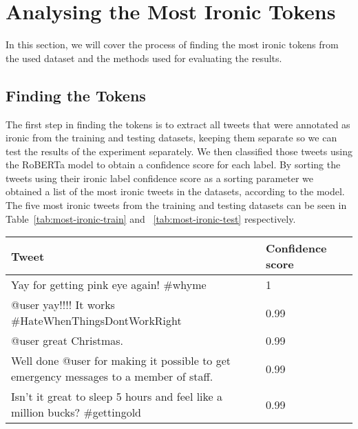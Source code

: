 \documentclass[10pt, a4paper]{article}
\begin{document}
\section{Analysing the Most Ironic Tokens}

In this section, we will cover the process of finding the most ironic tokens from the used dataset and the methods used for evaluating the results.

\subsection{Finding the Tokens}

The first step in finding the tokens is to extract all tweets that were annotated as ironic from the training and testing datasets, keeping them separate so we can test the results of the experiment separately.
We then classified those tweets using the RoBERTa model to obtain a confidence score for each label.
By sorting the tweets using their ironic label confidence score as a sorting parameter we obtained a list of the most ironic tweets in the datasets, according to the model.
The five most ironic tweets from the training and testing datasets can be seen in Table~\ref{tab:most-ironic-train} and ~\ref{tab:most-ironic-test} respectively.

\begin{table*}
\caption{Most Ironic Tweets in the Training Set}
\label{tab:most-ironic-train}
\begin{center}
\begin{tabular}{llr}
\toprule
Tweet & Confidence score\\
\midrule
Yay for getting pink eye again!  \#whyme                                                & 1 \\
@user yay!!!! It works  \#HateWhenThingsDontWorkRight                                   & 0.99 \\
@user great Christmas.                                                                  & 0.99 \\
Well done @user for making it possible to get emergency messages to a member of staff.  & 0.99 \\
Isn't it great to sleep 5 hours and feel like a million bucks?  \#gettingold            & 0.99 \\
\bottomrule
\end{tabular}
\end{center}
\end{table*}
\end{document}
